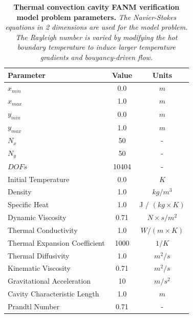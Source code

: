 \begin{table}[h!]
  \begin{center}
    \begin{tabular}{lcc}\hline\hline
      \multicolumn{1}{l}{Parameter}& 
      \multicolumn{1}{c}{Value}&
      \multicolumn{1}{c}{Units}\\\hline
      $x_{min}$ & 0.0 & $m$ \\
      $x_{max}$ & 1.0 & $m$ \\
      $y_{min}$ & 0.0 & $m$ \\
      $y_{max}$ & 1.0 & $m$ \\
      $N_x$ & 50 & - \\
      $N_y$ & 50 & - \\
      $DOFs$ & 10404 & - \\
      Initial Temperature & 0.0 & $K$ \\
      Density & 1.0 & $kg / m^3$ \\
      Specific Heat & 1.0 & J / $(kg \times K)$ \\
      Dynamic Viscosity & 0.71 & $N \times s / m^2$ \\
      Thermal Conductivity & 1.0 & $W / (m \times K)$ \\
      Thermal Expansion Coefficient & 1000 & $1 / K$ \\
      Thermal Diffusivity & 1.0 & $m^2 / s$ \\
      Kinematic Viscosity & 0.71 & $m^2 / s$ \\
      Gravitational Acceleration & 10 & $m / s^2$ \\
      Cavity Characteristic Length & 1.0 & $m$ \\
      Prandtl Number & 0.71 & - \\
      \hline\hline
    \end{tabular}
  \end{center}
  \caption{\textbf{Thermal convection cavity FANM verification model
      problem parameters.}  \textit{The Navier-Stokes equations in 2
      dimensions are used for the model problem. The Rayleigh number
      is varied by modifying the hot boundary temperature to induce
      larger temperature gradients and bouyancy-driven flow.}}
  \label{tab:thermal_convection_parameters}
\end{table}


